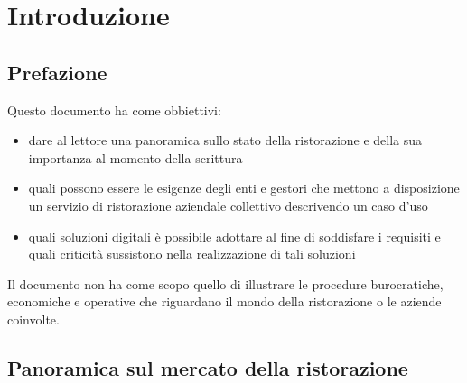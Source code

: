 \documentclass[a4paper, titlepage, 12pt, openright, twoside]{book}
\begin{document}
\begin{frontespizio}
\end{frontespizio}

\tableofcontents

\chapter{Introduzione}\label{chap:introduzione}

\section{Prefazione}

Questo documento ha come obbiettivi:
\begin{itemize}
	\item dare al lettore una panoramica sullo stato della ristorazione e della sua importanza al momento della scrittura
	\item quali possono essere le esigenze degli enti e gestori che mettono a disposizione un servizio di ristorazione aziendale collettivo descrivendo un caso d'uso
	\item quali soluzioni digitali è possibile adottare al fine di soddisfare i requisiti e quali criticità sussistono nella realizzazione di tali soluzioni
\end{itemize}

Il documento non ha come scopo quello di illustrare le procedure burocratiche, economiche e operative che riguardano il mondo della ristorazione o le aziende coinvolte.

\section{Panoramica sul mercato della ristorazione}
\end{document}
